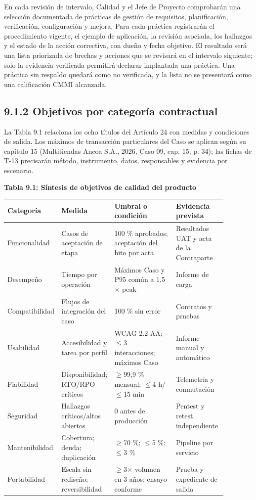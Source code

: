 \documentclass[11pt]{article}
\begin{document}
En cada revisión de intervalo, Calidad y el Jefe de Proyecto comprobarán una selección documentada de prácticas de gestión de requisitos, planificación, verificación, configuración y mejora. Para cada práctica registrarán el procedimiento vigente, el ejemplo de aplicación, la revisión asociada, los hallazgos y el estado de la acción correctiva, con dueño y fecha objetivo. El resultado será una lista priorizada de brechas y acciones que se revisará en el intervalo siguiente; solo la evidencia verificada permitirá declarar implantada una práctica. Una práctica sin respaldo quedará como no verificada, y la lista no se presentará como una calificación CMMI alcanzada.

\subsection{9.1.2 Objetivos por categoría contractual}

La Tabla 9.1 relaciona los ocho títulos del Artículo 24 con medidas y condiciones de salida. Los máximos de transacción particulares del Caso se aplican según su capítulo 15 (Multitiendas Ancoa S.A., 2026, Caso 09, cap. 15, p. 34); las fichas de T-13 precisarán método, instrumento, datos, responsables y evidencia por escenario.

\textbf{Tabla 9.1: Síntesis de objetivos de calidad del producto}

\begin{longtable}{p{0.16\linewidth}p{0.21\linewidth}p{0.28\linewidth}p{0.23\linewidth}}
\toprule
Categoría & Medida & Umbral o condición & Evidencia prevista \\
\midrule
\endhead
Funcionalidad & Casos de aceptación de etapa & 100 \% aprobados; aceptación del hito por acta & Resultados UAT y acta de la Contraparte \\
Desempeño & Tiempo por operación & Máximos Caso y P95 común a 1,5$\times$ peak & Informe de carga \\
Compatibilidad & Flujos de integración del caso & 100 \% sin error & Contratos y pruebas \\
Usabilidad & Accesibilidad y tarea por perfil & WCAG 2.2 AA; $\leq$3 interacciones; máximos Caso & Informe manual y automático \\
Fiabilidad & Disponibilidad; RTO/RPO críticos & $\geq$99,9 \% mensual; $\leq$4 h/$\leq$15 min & Telemetría y conmutación \\
Seguridad & Hallazgos críticos/altos abiertos & 0 antes de producción & Pentest y retest independiente \\
Mantenibilidad & Cobertura; deuda; duplicación & $\geq$70 \%; $\leq$5 \%; $\leq$3 \% & Pipeline por servicio \\
Portabilidad & Escala sin rediseño; reversibilidad & $\geq$3$\times$ volumen en 3 años; ensayo conforme & Prueba y expediente de salida \\
\bottomrule
\end{longtable}
\end{document}

